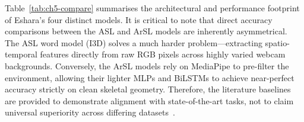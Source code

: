 \noindent Table~\ref{tab:ch5-compare} summarises the architectural and performance footprint of Eshara's four distinct models. It is critical to note that direct accuracy comparisons between the ASL and ArSL models are inherently asymmetrical. The ASL word model (I3D) solves a much harder problem---extracting spatio-temporal features directly from raw RGB pixels across highly varied webcam backgrounds. Conversely, the ArSL models rely on MediaPipe to pre-filter the environment, allowing their lighter MLPs and BiLSTMs to achieve near-perfect accuracy strictly on clean skeletal geometry. Therefore, the literature baselines are provided to demonstrate alignment with state-of-the-art tasks, not to claim universal superiority across differing datasets~\cite{li2020wlasl,sidig2021karsl,dabwan2023cnnlstm}.\par\vspace{0.3cm}

\begin{table}[H]
\centering
\caption{Eshara four-model summary.}
\label{tab:ch5-compare}
\footnotesize
\renewcommand{\arraystretch}{1.6}
\end{table}
\vspace{0.4cm}

